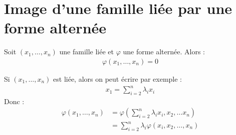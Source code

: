 \documentclass[../main.tex]{subfiles}
\begin{document}
\section{Image d'une famille liée par une forme alternée}
\begin{tcolorbox}[title=Propostion 30.21, title filled=false, colframe=lightblue, colback=lightblue!10!white]
    Soit $(x_1, \ldots, x_n)$ une famille liée et $\varphi$ une forme alternée. Alors :
    \begin{align*}
        \varphi(x_1, \ldots, x_n) = 0
    \end{align*}
\end{tcolorbox}

\noindent Si $(x_1, \ldots, x_n)$ est liée, alors on peut écrire par exemple : 
\begin{align*}
    x_1 = \sum_{i=2}^n \lambda_i x_i
\end{align*}
Donc : 
\begin{align*}
    \varphi(x_1, \ldots, x_n) &= \varphi \left( \sum_{i=2}^{n} \lambda_i x_i, x_2, \ldots x_n \right) \\ 
    &= \sum_{i=2}^{n} \lambda_i \varphi(x_i, x_2, \ldots, x_n)
\end{align*}
\end{document}

